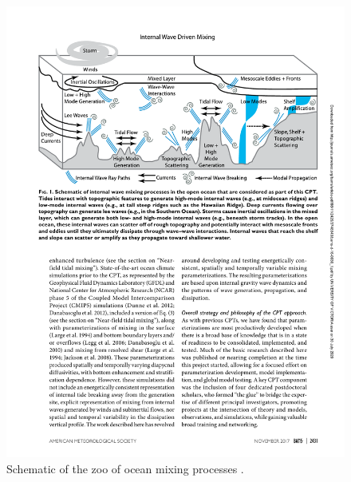 \begin{figure}[hbt]
  \begin{center}
    \includegraphics{figs/WaterMasses/MacKinnonEtAl17Fig1}
    \caption{Schematic of the zoo of ocean mixing processes \citep{MacKinnonEtAl17}.}
    \label{fig:MacKinnonEtAl17Fig1}  
  \end{center}
\end{figure}



